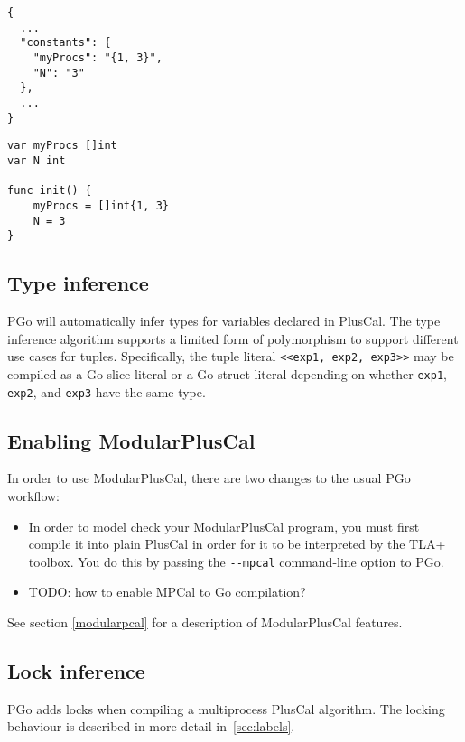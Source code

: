 \noindent\begin{minipage}{0.45\textwidth}
\begin{lstlisting}
{
  ...
  "constants": {
    "myProcs": "{1, 3}",
    "N": "3"
  },
  ...
}
\end{lstlisting}
\end{minipage}
\hfill\begin{minipage}{0.45\textwidth}
\begin{lstlisting}[language=golang]
var myProcs []int
var N int

func init() {
	myProcs = []int{1, 3}
	N = 3
}
\end{lstlisting}
\end{minipage}

\subsection{Type inference}
PGo will automatically infer types for variables declared in PlusCal. The type inference algorithm supports a limited form of polymorphism to support different use cases for tuples. Specifically, the tuple literal \lstinline[language=pcal]|<<exp1, exp2, exp3>>| may be compiled as a Go slice literal or a Go struct literal depending on whether \lstinline[language=pcal]|exp1|, \lstinline[language=pcal]|exp2|, and \lstinline[language=pcal]|exp3| have the same type.

\subsection{Enabling ModularPlusCal}

In order to use ModularPlusCal, there are two changes to the usual PGo workflow:
\begin{itemize}
    \item In order to model check your ModularPlusCal program, you must first compile it into plain PlusCal in order for it to be interpreted by the TLA+ toolbox. You do this by passing the \lstinline|--mpcal| command-line option to PGo.
    \item TODO: how to enable MPCal to Go compilation?
\end{itemize}

See section \ref{modularpcal} for a description of ModularPlusCal features.

\subsection{Lock inference}
PGo adds locks when compiling a multiprocess PlusCal algorithm. The locking behaviour is described in more detail in~\ref{sec:labels}.
